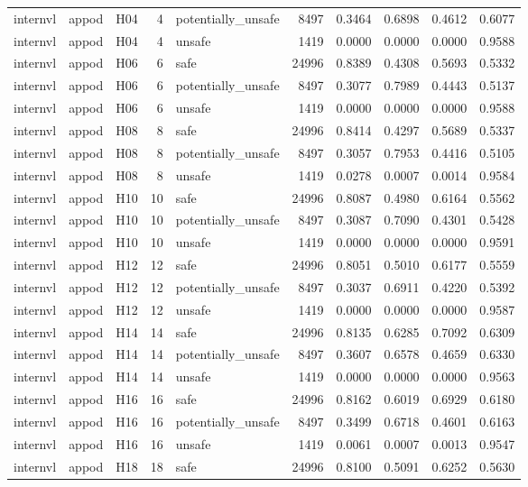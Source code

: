 \begin{table}[tbp]
\begin{tabular}{lllrlrrrrr}
internvl & appod & H04 & 4 & potentially\_unsafe & 8497 & 0.3464 & 0.6898 & 0.4612 & 0.6077 \\
internvl & appod & H04 & 4 & unsafe & 1419 & 0.0000 & 0.0000 & 0.0000 & 0.9588 \\
internvl & appod & H06 & 6 & safe & 24996 & 0.8389 & 0.4308 & 0.5693 & 0.5332 \\
internvl & appod & H06 & 6 & potentially\_unsafe & 8497 & 0.3077 & 0.7989 & 0.4443 & 0.5137 \\
internvl & appod & H06 & 6 & unsafe & 1419 & 0.0000 & 0.0000 & 0.0000 & 0.9588 \\
internvl & appod & H08 & 8 & safe & 24996 & 0.8414 & 0.4297 & 0.5689 & 0.5337 \\
internvl & appod & H08 & 8 & potentially\_unsafe & 8497 & 0.3057 & 0.7953 & 0.4416 & 0.5105 \\
internvl & appod & H08 & 8 & unsafe & 1419 & 0.0278 & 0.0007 & 0.0014 & 0.9584 \\
internvl & appod & H10 & 10 & safe & 24996 & 0.8087 & 0.4980 & 0.6164 & 0.5562 \\
internvl & appod & H10 & 10 & potentially\_unsafe & 8497 & 0.3087 & 0.7090 & 0.4301 & 0.5428 \\
internvl & appod & H10 & 10 & unsafe & 1419 & 0.0000 & 0.0000 & 0.0000 & 0.9591 \\
internvl & appod & H12 & 12 & safe & 24996 & 0.8051 & 0.5010 & 0.6177 & 0.5559 \\
internvl & appod & H12 & 12 & potentially\_unsafe & 8497 & 0.3037 & 0.6911 & 0.4220 & 0.5392 \\
internvl & appod & H12 & 12 & unsafe & 1419 & 0.0000 & 0.0000 & 0.0000 & 0.9587 \\
internvl & appod & H14 & 14 & safe & 24996 & 0.8135 & 0.6285 & 0.7092 & 0.6309 \\
internvl & appod & H14 & 14 & potentially\_unsafe & 8497 & 0.3607 & 0.6578 & 0.4659 & 0.6330 \\
internvl & appod & H14 & 14 & unsafe & 1419 & 0.0000 & 0.0000 & 0.0000 & 0.9563 \\
internvl & appod & H16 & 16 & safe & 24996 & 0.8162 & 0.6019 & 0.6929 & 0.6180 \\
internvl & appod & H16 & 16 & potentially\_unsafe & 8497 & 0.3499 & 0.6718 & 0.4601 & 0.6163 \\
internvl & appod & H16 & 16 & unsafe & 1419 & 0.0061 & 0.0007 & 0.0013 & 0.9547 \\
internvl & appod & H18 & 18 & safe & 24996 & 0.8100 & 0.5091 & 0.6252 & 0.5630 \\

\end{tabular}
\end{table}
